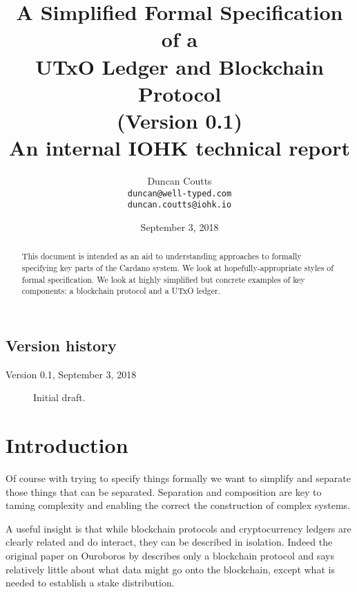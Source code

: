 \documentclass[11pt,a4paper]{article}
\begin{document}
\title{A Simplified Formal Specification of a \\ UTxO Ledger and Blockchain Protocol \\
       {\small (Version 0.1)} \\
       {\large \sc An internal IOHK technical report}}
\author{Duncan Coutts \\ {\small \texttt{duncan@well-typed.com}} \\
                         {\small \texttt{duncan.coutts@iohk.io}}}
\date{September 3, 2018}

\maketitle

\begin{abstract}
This document is intended as an aid to understanding approaches to formally
specifying key parts of the Cardano system. We look at hopefully-appropriate
styles of formal specification. We look at highly simplified but concrete
examples of key components: a blockchain protocol and a UTxO ledger.
\end{abstract}

\tableofcontents
\listoffigures

\subsection*{Version history}

\begin{description}
\item[Version 0.1, September 3, 2018] Initial draft.
\end{description}

\section{Introduction}

Of course with trying to specify things formally we want to simplify and
separate those things that can be separated. Separation and composition are
key to taming complexity and enabling the correct the construction of complex
systems.

A useful insight is that while blockchain protocols and cryptocurrency ledgers
are clearly related and do interact, they can be described in isolation.
Indeed the original paper on Ouroboros by \citet{ouroboros_classic} describes
only a blockchain protocol and says relatively little about what data might go
onto the blockchain, except what is needed to establish a stake distribution.
\end{document}
